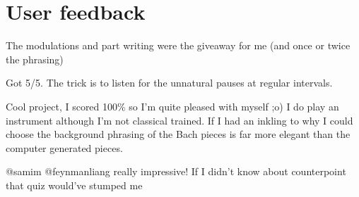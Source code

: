 \documentclass[dissertation.tex]{subfiles}
\begin{document}

\section{User feedback}

The modulations and part writing were the giveaway for me (and once or twice the phrasing)

Got 5/5. The trick is to listen for the unnatural pauses at regular intervals.

Cool project, I scored 100\% so I'm quite pleased with myself ;o) I do
play an instrument although I'm not classical trained. If I had an
inkling to why I could choose the background phrasing of the Bach
pieces is far more elegant than the computer generated pieces.

@samim @feynmanliang really impressive! If I didn't know about counterpoint that quiz would've stumped me



\printbibliography
\end{document}
